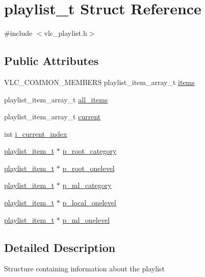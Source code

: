 \hypertarget{structplaylist__t}{}\section{playlist\+\_\+t Struct Reference}
\label{structplaylist__t}


{\ttfamily \#include $<$vlc\+\_\+playlist.\+h$>$}

\subsection*{Public Attributes}
\begin{DoxyCompactItemize}
\item 
V\+L\+C\+\_\+\+C\+O\+M\+M\+O\+N\+\_\+\+M\+E\+M\+B\+E\+RS playlist\+\_\+item\+\_\+array\+\_\+t \hyperlink{structplaylist__t_a557d5e14ba1833fb818e10768b293d52}{items}
\item 
playlist\+\_\+item\+\_\+array\+\_\+t \hyperlink{structplaylist__t_a67d8a49cdc2470b32ec609b5fd7e77aa}{all\+\_\+items}
\item 
playlist\+\_\+item\+\_\+array\+\_\+t \hyperlink{structplaylist__t_aed640305598b89257cbcc5244159538f}{current}
\item 
int \hyperlink{structplaylist__t_a718e605981b96aec4b29eeb21d62f3e3}{i\+\_\+current\+\_\+index}
\item 
\hyperlink{structplaylist__item__t}{playlist\+\_\+item\+\_\+t} $\ast$ \hyperlink{structplaylist__t_af38747b93fe497de5ee8560ce5d714f6}{p\+\_\+root\+\_\+category}
\item 
\hyperlink{structplaylist__item__t}{playlist\+\_\+item\+\_\+t} $\ast$ \hyperlink{structplaylist__t_a00fd2f3e40539a0df99ac4c8b04555af}{p\+\_\+root\+\_\+onelevel}
\item 
\hyperlink{structplaylist__item__t}{playlist\+\_\+item\+\_\+t} $\ast$ \hyperlink{structplaylist__t_ab7ea849499094ef89a601ae3dce25105}{p\+\_\+ml\+\_\+category}
\item 
\hyperlink{structplaylist__item__t}{playlist\+\_\+item\+\_\+t} $\ast$ \hyperlink{structplaylist__t_a6b6d527c61183755af96b419f868604f}{p\+\_\+local\+\_\+onelevel}
\item 
\hyperlink{structplaylist__item__t}{playlist\+\_\+item\+\_\+t} $\ast$ \hyperlink{structplaylist__t_a3c6a66a9d5ba4f53bafcf7f7e114514e}{p\+\_\+ml\+\_\+onelevel}
\end{DoxyCompactItemize}


\subsection{Detailed Description}
Structure containing information about the playlist 

